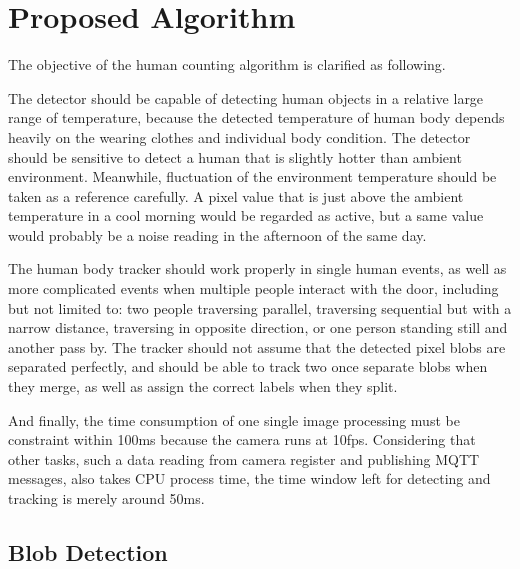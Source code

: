\chapter{Proposed Algorithm}\label{ch:algorithm}
The objective of the human counting algorithm is clarified as following.

The detector should be capable of detecting human objects in a relative large range of temperature, because the detected temperature of human body depends heavily on the wearing clothes and individual body condition. The detector should be sensitive to detect a human that is slightly hotter than ambient environment. Meanwhile, fluctuation of the environment temperature should be taken as a reference carefully. A pixel value that is just above the ambient temperature in a cool morning would be regarded as active, but a same value would probably be a noise reading in the afternoon of the same day.

The human body tracker should work properly in single human events, as well as more complicated events when multiple people interact with the door, including but not limited to: two people traversing parallel, traversing sequential but with a narrow distance, traversing in opposite direction, or one person standing still and another pass by. The tracker should not assume that the detected pixel blobs are separated perfectly, and should be able to track two once separate blobs when they merge, as well as assign the correct labels when they split.

And finally, the time consumption of one single image processing must be constraint within 100ms because the camera runs at 10fps. Considering that other tasks, such a data reading from camera register and publishing MQTT messages, also takes CPU process time, the time window left for detecting and tracking is merely around 50ms.
\section{Blob Detection} \label{sec:detect}

